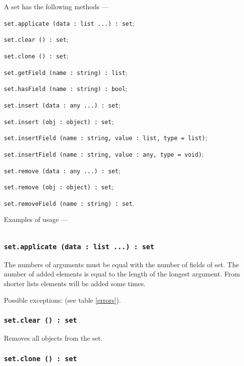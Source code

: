 A set has the following methods —
\begin{icItems}
\item \texttt{set.applicate (data : list ...) : set};
\item \texttt{set.clear () : set};
\item \texttt{set.clone () : set};
\item \texttt{set.getField (name : string) : list};
\item \texttt{set.hasField (name : string) : bool};
\item \texttt{set.insert (data : any ...) : set};
\item \texttt{set.insert (obj : object) : set};
\item \texttt{set.insertField (name : string, value : list, type = list)};
\item \texttt{set.insertField (name : string, value : any, type = void)};
\item \texttt{set.remove (data : any ...) : set};
\item \texttt{set.remove (obj : object) : set};
\item \texttt{set.removeField (name : string) : set}.
\end{icItems}


Examples of usage —
\inputminted[linenos]{icl}{../sources/setmethods.icL}

\subsubsection{\texttt{set.applicate (data : list ...) : set}}

The numbers of arguments must be equal with the number of fields of set. The number of added elements is equal to the length of the longest argument. From shorter lists elements will be added some times.

Possible exceptions:  (see table \ref{errors}).

\subsubsection{\texttt{set.clear () : set}}

Removes all objects from the set.

\subsubsection{\texttt{set.clone () : set}}

